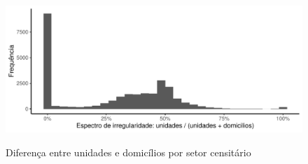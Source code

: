 \begin{figure}[h]
    \centering
    \caption{Diferença entre unidades e domicílios por setor censitário}
    \includegraphics[width = \linewidth]{imagens/disparidade_censoIPTU.pdf}
    \label{fig:balanco}
\end{figure}

